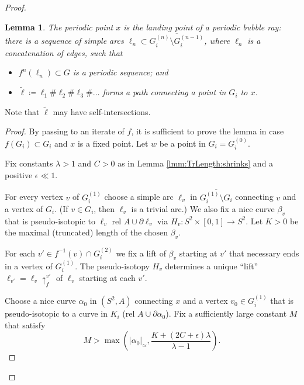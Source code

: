 \documentclass{amsart}
\theoremstyle{plain}
\newtheorem{lemma}[theorem]{Lemma}
\theoremstyle{definition}
\theoremstyle{remark}
\newcommand\lift[2]{{\uparrow}_{#1}^{#2}}
\begin{document}
\begin{proof}
\begin{lemma}
\label{lem:bubble ray land}
The periodic point  $x$ is the landing point of a \emph{periodic bubble ray}: there is a sequence of simple arcs $\ell_n\subset \overline {G_{i}^{(n)}\setminus G_{i}^{(n-1)}}$, where $\ell_n$ is a concatenation of edges,  such that
\begin{itemize}
\item $f^n(\ell_n)\subset G$ is a periodic sequence; and
\item $\widetilde \ell\coloneq \ell_1\#\ell_2\#\ell_3\#\dots $ forms a path connecting a point in $G_i$ to $x$.
 \end{itemize} 
 \end{lemma}
 \noindent Note that $\widetilde \ell$ may have self-intersections.
\begin{proof}

By passing to an iterate of $f$, it is sufficient to prove the lemma in case $f(G_i)\subset G_i$ and $x$ is a fixed point.  Let $w$ be a point in $G_i=G_i^{(0)}$.  %

Fix constants $\lambda>1$ and $C>0$ as in Lemma \ref{lmm:TrLength:shrinks} and a positive $\epsilon\ll1$. 

For every vertex $v$ of $G_i^{(1)}$ choose a simple arc $\ell_v$ in $\overline {G_{i}^{(1)}\setminus G_{i}}$ connecting $v$ and a vertex of $G_i$. (If $v\in G_i$, then $\ell_v$ is a trivial arc.) We also fix a nice curve $\beta_v$ that is pseudo-isotopic to $\ell_v$ rel  $A \cup \partial  \ell_v$ via $H_v\colon S^2\times [0,1]\to S^2$.  Let $K>0$ be the maximal (truncated) length of the chosen $\beta_v$.  

For each $v'\in f^{-1}(v)\cap G_i^{(2)}$ we fix a lift of $\beta_v$ starting at $v'$ that necessary ends in a vertex of $G_i^{(1)}$.  The pseudo-isotopy $H_v$ determines a unique ``lift'' $\ell_{v'}=\ell_v \lift{f}{v'}$ of $\ell_v$ starting at each $v'$. 

Choose a nice curve $\alpha_0$ in $(S^2,A)$ connecting $x$ and a vertex $v_0\in G^{(1)}_i$ that is pseudo-isotopic to a curve in $K_i$ (rel $A \cup \partial \alpha_0$).  Fix a sufficiently large constant $M$ that satisfy \[M>\max\left(|\alpha_0|_\approx,  \frac{K + (2C+\epsilon)\lambda}{\lambda-1}\right).\]


\end{proof}
\end{proof}
\end{document}
